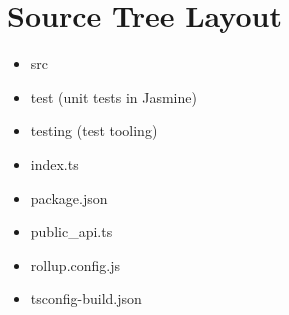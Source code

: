 \section{Source Tree Layout}


\begin{itemize}
  \item src
  \item test (unit tests in Jasmine)
  \item testing (test tooling)
\end{itemize}


\begin{itemize}
  \item index.ts
  \item package.json
  \item public\_api.ts
  \item rollup.config.js
  \item tsconfig-build.json
\end{itemize}




